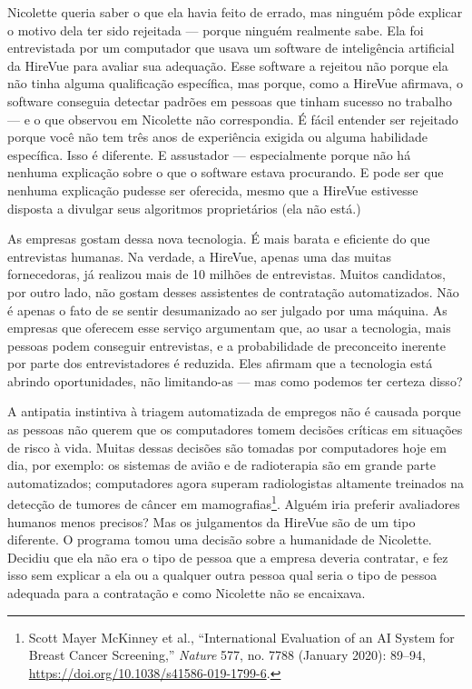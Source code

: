 Nicolette queria saber o que ela havia feito de errado, mas ninguém pôde
explicar o motivo dela ter sido rejeitada --- porque ninguém realmente sabe.
Ela foi entrevistada por um computador que usava um software de inteligência
artificial da HireVue para avaliar sua adequação. Esse software a rejeitou não
porque ela não tinha alguma qualificação específica, mas porque, como a HireVue
afirmava, o software conseguia detectar padrões em pessoas que tinham sucesso no
trabalho --- e o que observou em Nicolette não correspondia. É fácil entender
ser rejeitado porque você não tem três anos de experiência exigida ou alguma
habilidade específica. Isso é diferente. E assustador --- especialmente porque
não há nenhuma explicação sobre o que o software estava procurando. E pode ser
que nenhuma explicação pudesse ser oferecida, mesmo que a HireVue estivesse
disposta a divulgar seus algoritmos proprietários (ela não está.)

As empresas gostam dessa nova tecnologia. É mais barata e eficiente do que 
entrevistas humanas. Na verdade, a HireVue, apenas uma das muitas fornecedoras, 
já realizou mais de 10 milhões de entrevistas. Muitos candidatos, por outro 
lado, não gostam desses assistentes de contratação automatizados. Não é apenas o
fato de se sentir desumanizado ao ser julgado por uma máquina. As empresas que 
oferecem esse serviço argumentam que, ao usar a tecnologia, mais pessoas podem 
conseguir entrevistas, e a probabilidade de preconceito inerente por parte dos
entrevistadores é reduzida. Eles afirmam que a tecnologia está abrindo
oportunidades, não limitando-as --- mas como podemos ter certeza disso?

A antipatia instintiva à triagem automatizada de empregos não é causada porque
as pessoas não querem que os computadores tomem decisões críticas em situações
de risco à vida. Muitas dessas decisões são tomadas por computadores hoje em
dia, por exemplo: os sistemas de avião e de radioterapia são em grande parte 
automatizados; computadores agora superam radiologistas altamente treinados na 
detecção de tumores de câncer em mamografias\footnote{Scott Mayer McKinney et
al., ``International Evaluation of an AI System for Breast Cancer Screening,''
\textit{Nature} 577, no. 7788 (January 2020): 89--94,
\url{https://doi.org/10.1038/s41586-019-1799-6}.}. Alguém iria preferir
avaliadores humanos menos precisos? Mas os julgamentos da HireVue são de um tipo
diferente. O programa tomou uma decisão sobre a humanidade de Nicolette. Decidiu
que ela não era o tipo de pessoa que a empresa deveria contratar, e fez isso sem
explicar a ela ou a qualquer outra pessoa qual seria o tipo de pessoa adequada
para a contratação e como Nicolette não se encaixava.

